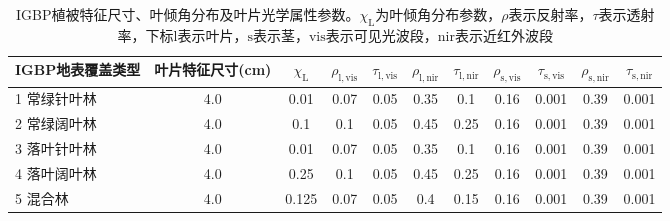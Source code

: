 \begin{landscape}
  \begin{table}[htbp]
    \centering
    \caption[IGBP植被特征尺寸、叶倾角分布及叶片光学属性参数]{IGBP植被特征尺寸、叶倾角分布及叶片光学属性参数。$\chi_{\mathrm {L}} $为叶倾角分布参数，$\rho$表示反射率，$\tau$表示透射率，下标${\mathrm {l}}$表示叶片，${\mathrm {s}}$表示茎，${\mathrm {vis}}$表示可见光波段，${\mathrm {nir}}$表示近红外波段}
    \label{tab:IGBP植被特征尺寸叶倾角分布及叶片光学属性参数1}
    \begin{tabular}{@{}lcccccccccc@{}}
      \toprule
      IGBP地表覆盖类型        & 叶片特征尺寸(cm) & $\chi_{\mathrm {L}} $ & $\rho_{\mathrm{l, vis}}$ & $\tau_{\mathrm{l, vis}}$ & $\rho_{\mathrm{l, nir}}$ & $\tau_{\mathrm{l, nir}}$ & $\rho_{\mathrm{s, vis}}$ & $\tau_{\mathrm{s, vis}}$ & $\rho_{\mathrm{s, nir}}$ & $\tau_{\mathrm{s, nir}}$ \\ \midrule
      1 常绿针叶林            & 4.0              & \num {0.01  }         & 0.07                     & 0.05                     & 0.35                     & 0.1                      & 0.16                     & 0.001                    & 0.39                     & 0.001                    \\
      2 常绿阔叶林            & 4.0              & \num { 0.1  }         & 0.1                      & 0.05                     & 0.45                     & 0.25                     & 0.16                     & 0.001                    & 0.39                     & 0.001                    \\
      3 落叶针叶林            & 4.0              & \num { 0.01 }         & 0.07                     & 0.05                     & 0.35                     & 0.1                      & 0.16                     & 0.001                    & 0.39                     & 0.001                    \\
      4 落叶阔叶林            & 4.0              & \num { 0.25 }         & 0.1                      & 0.05                     & 0.45                     & 0.25                     & 0.16                     & 0.001                    & 0.39                     & 0.001                    \\
      5 混合林                & 4.0              & \num { 0.125}         & 0.07                     & 0.05                     & 0.4                      & 0.15                     & 0.16                     & 0.001                    & 0.39                     & 0.001                    \\

\end{tabular}
\end{table}
\end{landscape}

